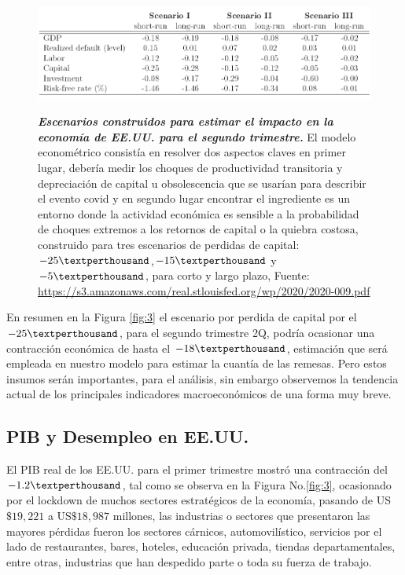 \begin{figure}[H]
	\centering
	\resizebox{16 cm}{!} { 	
	\includegraphics[width=1\linewidth]{Imagenes/EscenariosUsa}}
	\caption{\textbf{\textit{Escenarios construidos para estimar el impacto en la economía de EE.UU. para el segundo trimestre.}} {\small El modelo econométrico consistía en resolver dos aspectos claves en primer lugar, debería medir los choques de productividad transitoria y depreciación de capital u obsolescencia que se usarían para describir el evento covid y en segundo lugar encontrar el ingrediente es un entorno donde la actividad económica es sensible a la probabilidad de choques extremos a los retornos de capital o la quiebra costosa, construido para tres escenarios de perdidas de capital: $-25 \textperthousand$,$-15 \textperthousand$ y $-5 \textperthousand$, para corto y largo plazo, Fuente:  \href{https://s3.amazonaws.com/real.stlouisfed.org/wp/2020/2020-009.pdf}{https://s3.amazonaws.com/real.stlouisfed.org/wp/2020/2020-009.pdf}}
	} 
	\label{fig:2}

	
\end{figure}	
	
En resumen en la Figura \eqref{fig:3} el escenario por perdida de capital por el $-25 \textperthousand$, para el segundo trimestre 2Q, podría ocasionar una contracción económica de hasta el $-18 \textperthousand$, estimación que será empleada en nuestro modelo para estimar la cuantía de las remesas. Pero estos insumos serán importantes, para el análisis, sin embargo observemos la tendencia actual de los principales indicadores macroeconómicos de una forma muy breve.

\subsection{PIB y Desempleo en EE.UU.}

El PIB real de los EE.UU. para el primer trimestre mostró una contracción del $-1.2 \textperthousand$, tal como se observa en la Figura No.\eqref{fig:3}, ocasionado por el lockdown de muchos sectores estratégicos de la economía, pasando de US$\$ 19,221$ a US$\$ 18,987$ millones, las industrias o sectores que presentaron las mayores pérdidas fueron los sectores cárnicos, automovilístico, servicios por el lado de restaurantes, bares, hoteles, educación privada, tiendas departamentales, entre otras, industrias que han despedido parte o toda su fuerza de trabajo.    

